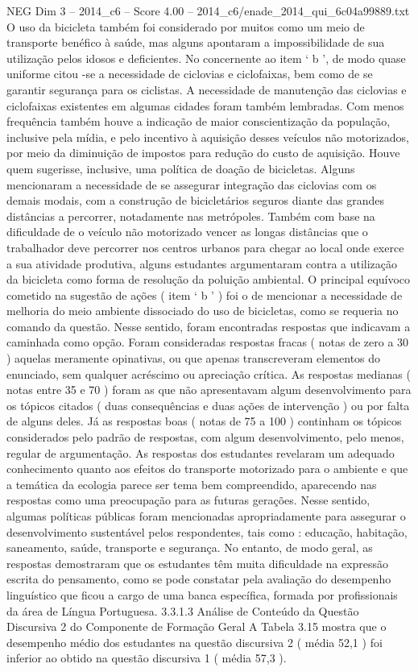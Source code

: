 \begin{textsample}{NEG Dim 3 – 2014\_c6 – Score 4.00 – 2014\_c6/enade\_2014\_qui\_6c04a99889.txt}
O uso da bicicleta também foi considerado por muitos como um meio de transporte benéfico à saúde, mas alguns apontaram a impossibilidade de sua utilização pelos idosos e deficientes.
No concernente ao item ‘ b ’, de modo quase uniforme citou -se a necessidade de ciclovias e ciclofaixas, bem como de se garantir segurança para os ciclistas.
A necessidade de manutenção das ciclovias e ciclofaixas existentes em algumas cidades foram também lembradas.
Com menos frequência também houve a indicação de maior conscientização da população, inclusive pela mídia, e pelo incentivo à aquisição desses veículos não motorizados, por meio da diminuição de impostos para redução do custo de aquisição.
Houve quem sugerisse, inclusive, uma política de doação de bicicletas.
Alguns mencionaram a necessidade de se assegurar integração das ciclovias com os demais modais, com a construção de bicicletários seguros diante das grandes distâncias a percorrer, notadamente nas metrópoles.
Também com base na dificuldade de o veículo não motorizado vencer as longas distâncias que o trabalhador deve percorrer nos centros urbanos para chegar ao local onde exerce a sua atividade produtiva, alguns estudantes argumentaram contra a utilização da bicicleta como forma de resolução da poluição ambiental.
O principal equívoco cometido na sugestão de ações ( item ‘ b ’ ) foi o de mencionar a necessidade de melhoria do meio ambiente dissociado do uso de bicicletas, como se requeria no comando da questão.
Nesse sentido, foram encontradas respostas que indicavam a caminhada como opção.
Foram consideradas respostas fracas ( notas de zero a 30 ) aquelas meramente opinativas, ou que apenas transcreveram elementos do enunciado, sem qualquer acréscimo ou apreciação crítica.
As respostas medianas ( notas entre 35 e 70 ) foram as que não apresentavam algum desenvolvimento para os tópicos citados ( duas consequências e duas ações de intervenção ) ou por falta de alguns deles.
Já as respostas boas ( notas de 75 a 100 ) continham os tópicos considerados pelo padrão de respostas, com algum desenvolvimento, pelo menos, regular de argumentação.
As respostas dos estudantes revelaram um adequado conhecimento quanto aos efeitos do transporte motorizado para o ambiente e que a temática da ecologia parece ser tema bem compreendido, aparecendo nas respostas como uma preocupação para as futuras gerações.
Nesse sentido, algumas políticas públicas foram mencionadas apropriadamente para assegurar o desenvolvimento sustentável pelos respondentes, tais como : educação, habitação, saneamento, saúde, transporte e segurança.
No entanto, de modo geral, as respostas demostraram que os estudantes têm muita dificuldade na expressão escrita do pensamento, como se pode constatar pela avaliação do desempenho linguístico que ficou a cargo de uma banca específica, formada por profissionais da área de Língua Portuguesa. 3.3.1.3 Análise de Conteúdo da Questão Discursiva 2 do Componente de Formação Geral A Tabela 3.15 mostra que o desempenho médio dos estudantes na questão discursiva 2 ( média 52,1 ) foi inferior ao obtido na questão discursiva 1 ( média 57,3 ).

\end{textsample}
